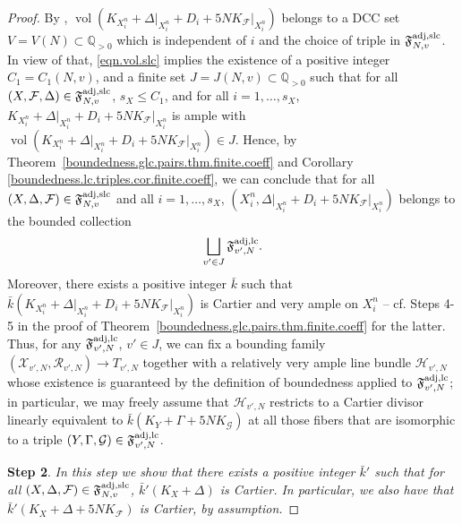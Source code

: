 \documentclass[12pt, a4paper]{amsart}
\DeclareMathOperator{\vol}{\mathrm{vol}}
\newcommand{\setfoliation}[1]{\mathfrak F^{\rm adj, #1}_{N, v}}
\newcounter{Theorem}
\theoremstyle{definition}
\theoremstyle{named}
\begin{document}
\begin{proof}
		By 
		\cite[Theorem 1.3]{bir.2103}, 
		$\vol(K_{X_i^n}+\Delta\vert_{X^n_i}+D_i+5NK_\mathcal{F}\vert_{X_i^n})$
		belongs to a DCC set 
		$V=V(N) \subset \mathbb Q_{>0}$
		which is independent of 
		$i$ 
		and the choice of triple in 
		$\setfoliation{slc}$.
		In view of that,
		\eqref{eqn.vol.slc} 
		implies the existence of a positive integer 
		$C_1=C_1(N, v)$,
		and a finite set 
		$J= J(N, v) \subset \mathbb Q_{>0}$
		such that for all 
		$(X,  \mathcal F, \Delta) \in \setfoliation{slc}$, 
		$s_X \leq C_1$, 
		and
		for all 
		$i=1, \dots, s_X$,
		$K_{X_i^n}+\Delta\vert_{X_i^n}+D_i+5NK_\mathcal{F}\vert_{X_i^n}$
		is ample with
		$\vol(K_{X_i^n}+\Delta\vert_{X_i^n}+D_i+5NK_\mathcal{F}\vert_{X_i^n}) \in J$.
		Hence, by 
		Theorem~\ref{boundedness.glc.pairs.thm.finite.coeff}
		and 
		Corollary 
		\ref{boundedness.lc.triples.cor.finite.coeff}, 
		we can conclude that 
		for all 
		$(X,  \Delta, \mathcal F) \in \setfoliation{slc}$
		and all
		$i=1, \dots, s_X$, 
		$(X^n_i, \Delta\vert_{X^n_i}+D_i+5NK_{\mathcal F}\vert_{X^n_i})$
		belongs to the bounded collection
		\[
		\bigsqcup_{v' \in J}
		\mathfrak{F}_{v', N}^{\rm adj, lc}.
		\]
		Moreover, there exists a positive integer 
		$\bar k$
		such that
		$    
		\bar k (K_{X^n_i}+\Delta\vert_{X^n_i}+D_i+5NK_{\mathcal F}\vert_{X^n_i})
		$
		is Cartier and very ample on 
		$X^n_i$
		--
		cf. Steps 4-5 in the proof of Theorem~\ref{boundedness.glc.pairs.thm.finite.coeff} for the latter.
		Thus, for any 
		$\mathfrak{F}_{v', N}^{\rm adj, lc}$,
		$v' \in J$,
		we can fix a bounding family 
		$(\mathcal X_{v', N}, \mathcal R_{v', N}) \to T_{v', N}$
		together with a relatively very ample line bundle 
		$\mathcal H_{v', N}$
		whose existence is guaranteed by 
		the definition of boundedness applied to 
		$\mathfrak{F}_{v', N}^{\rm adj, lc}$;
		in particular, we may freely assume that
		$\mathcal H_{v', N}$
		restricts to a Cartier divisor linearly equivalent to 
		$\bar k (K_{Y}+\Gamma+5NK_{\mathcal G})$
		at all those fibers that are isomorphic to a triple 
		$(Y, \Gamma, \mathcal G) \in \mathfrak{F}_{v', N}^{\rm adj, lc}$.
		
		\medskip
		
		{\bf Step 2}.
		{\it In this step we show that there exists a positive integer 
		$\bar k'$ such that 
		for all 
		$(X, \Delta, \mathcal F) \in \setfoliation{slc}$, 
		$\bar k'(K_X+\Delta)$ 
		is Cartier. 
		In particular, we also have that 
		$\bar k'(K_X+\Delta+5NK_{\mathcal F})$ is Cartier, 
		by assumption.}
		

\end{proof}
\end{document}

